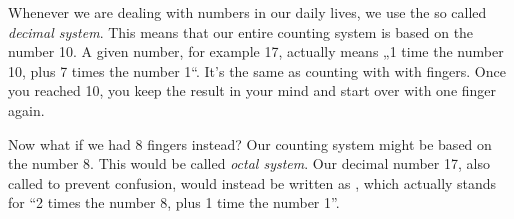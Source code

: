 
Whenever we are dealing with numbers in our daily lives, we use the so called \emph{decimal system}. This means that our entire counting system is based on the number 10. A given number, for example 17, actually means „1 time the number 10, plus 7 times the number 1``. It's the same as counting with with fingers. Once you reached 10, you keep the result in your mind and start over with one finger again.

Now what if we had 8 fingers instead? Our counting system might be based on the number 8. This would be called \emph{octal system}. Our decimal number 17, also called  to prevent confusion, would instead be written as , which actually stands for ``2 times the number 8, plus 1 time the number 1''.

